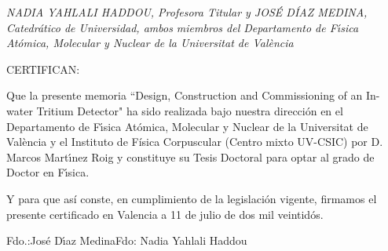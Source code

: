 \documentclass[12pt,spanish]{article}
\begin{document}
\vspace*{6cm}

{\sl    NADIA YAHLALI HADDOU, Profesora Titular  y JOS\'E D\'IAZ MEDINA, Catedrático de  Universidad, ambos
miembros del Departamento de F\'{\i}sica At\'omica, Molecular y Nuclear
de la Universitat de València
\vspace{0.5cm}

        CERTIFICAN:
\vspace{0.7cm}

        Que la presente memoria ``Design, Construction and Commissioning of an In-water Tritium Detector"
ha sido realizada bajo nuestra direcci\'on en
el Departamento de F\'{\i}sica At\'omica, Molecular y Nuclear de la 
Universitat
de València y el Instituto de Física Corpuscular (Centro mixto UV-CSIC)  por D. Marcos Mart\'{\i}nez Roig y constituye su Tesis 
Doctoral para optar al grado de Doctor en F\'{\i}sica.
\vspace{1.cm}

        Y para que así conste, en cumplimiento de la legislaci\'on vigente, firmamos
el presente certificado en Valencia a 11 de julio de dos mil veintidós.}
\vspace{1.cm}
\begin{center}
Fdo.:Jos\'e D\'{\i}az Medina\hfill Fdo: Nadia Yahlali Haddou
\end{center}
\end{document}
